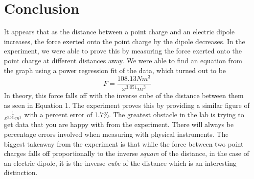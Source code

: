 \documentclass[12pt]{article}
\begin{document}
\section{Conclusion}
It appears that as the distance between a point charge and an electric dipole increases, the force exerted onto the point charge by the dipole decreases. In the experiment, we were able to prove this by measuring the force exerted onto the point charge at different distances away. We were able to find an equation from the graph using a power regression fit of the data, which turned out to be \[F=\frac{108.13Nm^3}{x^{3.051}m^3}\]
In theory, this force falls off with the inverse cube of the distance between them as seen in Equation 1. The experiment proves this by providing a similar figure of $\frac{1}{x^{3.051}m^3}$ with a percent error of 1.7\%. The greatest obstacle in the lab is trying to get data that you are happy with from the experiment. There will always be percentage errors involved when measuring with physical instruments. The biggest takeaway from the experiment is that while the force between two point charges falls off proportionally to the inverse \textit{square} of the distance, in the case of an electric dipole, it is the inverse \textit{cube} of the distance which is an interesting distinction.
\end{document}

